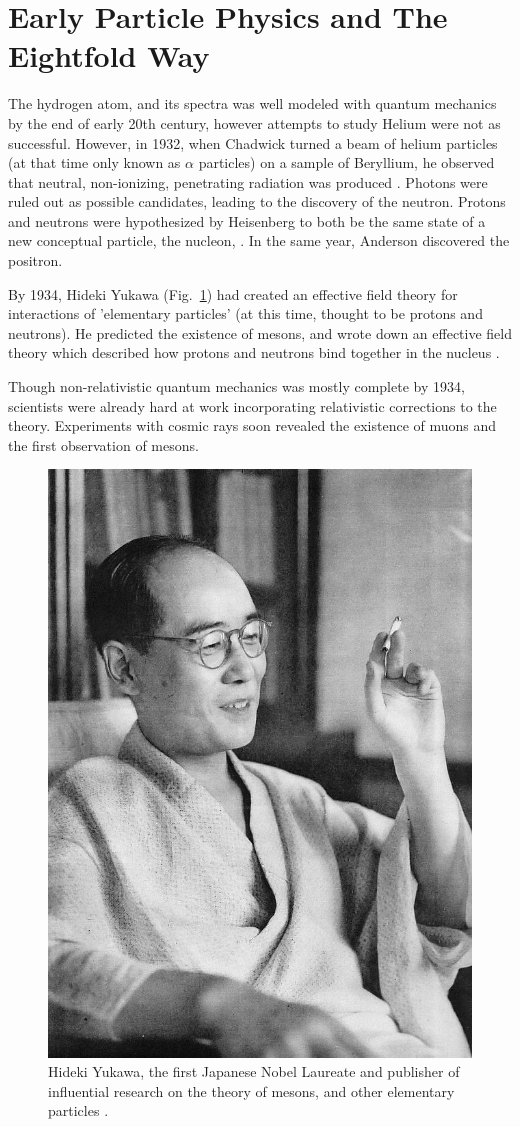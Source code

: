 \clearpage
\section{Early Particle Physics and The Eightfold Way}

The hydrogen atom, and its spectra was well modeled with quantum mechanics by
the end of early 20th century, however attempts to study Helium were not as
successful. However, in 1932,  when Chadwick turned a beam of
helium particles (at that time only known as $\alpha$ particles) on a sample of
Beryllium, he observed that neutral, non-ionizing, penetrating radiation was
produced  \cite{Krauss2015}. Photons were ruled out as possible
candidates, leading to the discovery of the neutron. Protons and neutrons were
hypothesized by Heisenberg to both be the same state of a new conceptual
particle, the nucleon,  \cite{Heisenberg1952}. In the same year, Anderson
discovered the positron. 

By 1934, Hideki Yukawa (Fig.~\ref{fig:hidekiyukawa}) had created an effective
field theory for interactions of 'elementary particles' (at this time, thought
to be protons and neutrons). He predicted the existence of mesons, and wrote
down an effective field theory which described how protons and neutrons bind
together in the nucleus \cite{Yukawa1935}. 

Though non-relativistic quantum mechanics was mostly complete by 1934,
scientists were already hard at work incorporating relativistic corrections to
the theory. Experiments with cosmic rays soon revealed the existence of muons
and the first observation of mesons.

\begin{figure}[ht]
	\begin{center}
		\includegraphics[width=0.5\linewidth]{./figures/hidekiyukawa.jpg}
		\caption{
			Hideki Yukawa, the first Japanese Nobel Laureate and publisher of
			influential research on the theory of mesons, and other elementary
			particles  \cite{YukawaPhoto1952}.
		}
		\label{fig:hidekiyukawa}
	\end{center}
\end{figure}

